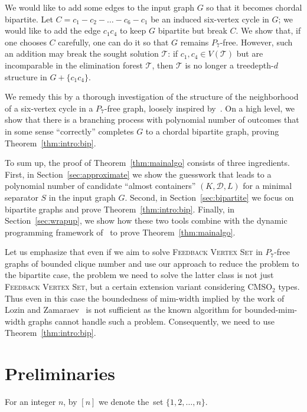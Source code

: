 \documentclass[11pt,a4paper]{article}
\theoremstyle{definition}
\def\T{\mathcal{T}}
\newcommand{\CMSO}{\textsf{CMSO}$_2$\xspace}
\begin{document}
We would like to add some edges to the input graph $G$ so that it becomes chordal
bipartite. Let $C = c_1-c_2-\ldots-c_6-c_1$ be an induced six-vertex cycle in $G$;
we would like to add the edge $c_1c_4$ to keep $G$ bipartite but break $C$. 
We show that, if one chooses $C$ carefully, one can do it so that $G$
remains $P_7$-free. However, such an addition may break the sought solution
$\T$: if $c_1,c_4 \in V(\T)$ but are incomparable in the elimination forest $\T$,
then $\T$ is no longer a treedepth-$d$ structure in $G+\{c_1c_4\}$. 

We remedy this by a thorough investigation of the structure 
of the neighborhood of a six-vertex cycle in a $P_7$-free graph, loosely
inspired by~\cite{BonomoCMSSZ18}. On a high level, we show that there is a branching process
with polynomial number of outcomes that in some sense ``correctly'' completes
$G$ to a chordal bipartite graph, proving Theorem~\ref{thm:intro:bip}.  

To sum up, the proof of Theorem~\ref{thm:mainalgo} consists of three ingredients.
First, in Section~\ref{sec:approximate} we show the guesswork that leads
to a polynomial number of candidate ``almost containers'' $(K,\mathcal{D},L)$
for a minimal separator $S$ in the input graph $G$. 
Second, in Section~\ref{sec:bipartite} we focus on bipartite graphs
and prove Theorem~\ref{thm:intro:bip}.
Finally, in Section~\ref{sec:wrapup}, we show how these two tools combine with
the dynamic programming framework of~\cite{FominTV15,Tara,DBLP:conf/soda/ChudnovskyMPPR24} 
to prove Theorem~\ref{thm:mainalgo}. 

Let us emphasize that  even if we aim to solve \textsc{Feedback Vertex Set} in $P_7$-free graphs of bounded clique number and use our approach to reduce the problem to the bipartite case, the problem we need to solve 
the latter class is not just \textsc{Feedback Vertex Set}, but a certain extension variant considering \CMSO types.
Thus even in this case the boundedness of mim-width implied by the work of Lozin and Zamaraev~\cite{DBLP:journals/ejc/LozinZ17} is not sufficient as the known algorithm for bounded-mim-width graphs cannot handle such a problem.
Consequently, we need to use Theorem~\ref{thm:intro:bip}.


\section{Preliminaries} \label{sec:prelim}
For an integer $n$, by $[n]$ we denote the~set $\{1,2,\dots, n\}$.
\end{document}
